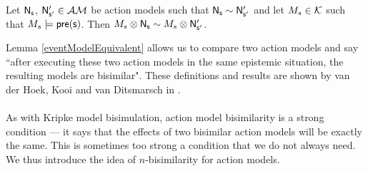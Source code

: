 \begin{lemma} \label{eventModelEquivalent}
Let $\mathrm{\mathsf{\mathrm{\mathsf{N}}_s}}$, $\mathrm{\mathsf{\mathrm{\mathsf{N}}'_{s'}}} \in \mathcal{AM}$ be action models such that $\mathrm{\mathsf{\mathrm{\mathsf{N}}_s}}
\sim \mathrm{\mathsf{\mathrm{\mathsf{N}}'_{s'}}}$
and let $M_s \in \mathcal{K}$ such that $M_s \models \mathrm{\mathsf{pre(s)}}$.
Then $M_s \otimes \mathrm{\mathsf{\mathrm{\mathsf{N}}_s}} \sim M_s \otimes \mathrm{\mathsf{\mathrm{\mathsf{N}}'_{s'}}}$.
\end{lemma}

Lemma \ref{eventModelEquivalent} allows us to compare two action models and say ``after executing
these two action models in the same epistemic situation, the resulting models are bisimilar".
These definitions and results are shown by van der Hoek, Kooi and van Ditsmarsch in
\cite{hoek2008dynamic}.\\
\\
As with Kripke model bisimulation, action model bisimilarity is a strong condition --- it says that the effects of two bisimilar
action models will be exactly the same.
This is sometimes too strong a condition that we do not always need.
We thus introduce the idea of $n$-bisimilarity for action models.

